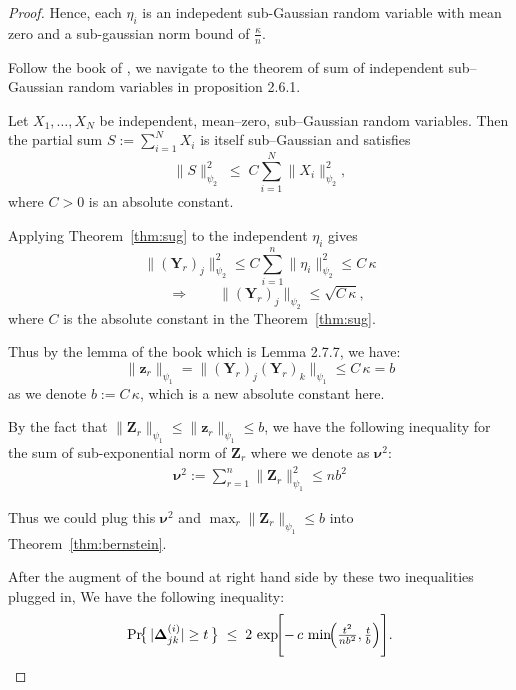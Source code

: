 \documentclass[11pt]{article}
\numberwithin{equation}{section}
\theoremstyle{plain}
\theoremstyle{definition}
\theoremstyle{remark}
\begin{document}
\begin{proof}
Hence, each \(\eta_{i}\) is an indepedent sub-Gaussian random variable with mean zero and a sub-gaussian norm bound of \(\frac{\kappa}{n}\).

Follow the book of \cite{vershynin2018high}, we navigate to the theorem of sum of independent sub–Gaussian random variables in proposition 2.6.1.

\begin{thm}
  \label{thm:sug}

  Let \(X_{1},\dots ,X_{N}\) be independent, mean–zero, sub–Gaussian
  random variables.  Then the partial sum
  \(S:=\sum_{i=1}^{N}X_{i}\) is itself sub–Gaussian and satisfies
  \[
    \bigl\|S\bigr\|_{\psi_{2}}^{2}
       \;\le\;
       C\sum_{i=1}^{N}\bigl\|X_{i}\bigr\|_{\psi_{2}}^{2},
  \]
  where \(C>0\) is an absolute constant.
  \end{thm}


  Applying Theorem~\ref{thm:sug} to the independent \(\eta_{i}\) gives
  \[
    \|(\mathbf{Y}_{r})_{j}\|_{\psi_{2}}^{2}
       \le C \sum_{i=1}^{n}\|\eta_{i}\|_{\psi_{2}}^{2}
       \le C\,\kappa
  \]
  \[
    \quad\Longrightarrow\qquad
    \|(\mathbf{Y}_{r})_{j}\|_{\psi_{2}}\le\sqrt{C\,\kappa},
  \]
  where \(C\) is the absolute constant in the Theorem~\ref{thm:sug}.

Thus by the lemma of the book\cite{vershynin2018high} which is Lemma 2.7.7, we have:
\[
  \|\mathbf{z}_{r}\|_{\psi_{1}} = \|(\mathbf{Y}_{r})_{j}(\mathbf{Y}_{r})_{k}\|_{\psi_{1}} \leq C\,\kappa = b
\]
as we denote \( b := C\,\kappa \), which is a new absolute constant here.

By the fact that $\|\mathbf{Z}_{r}\|_{\psi_{1}} \leq \|\mathbf{z}_{r}\|_{\psi_{1}} \leq b$, we have
the following inequality for the sum of sub-exponential norm of \(\mathbf{Z}_{r}\) where we denote as \(\boldsymbol{\nu}^{2}\):
\begin{align*}
  \boldsymbol{\nu}^{2} := \sum_{r=1}^{n}\|\mathbf{Z}_{r}\|_{\psi_{1}}^{2}
  \leq n b^{2}
\end{align*}

Thus we could plug this $\boldsymbol\nu^{2}$ and $\max_{r}\|\mathbf{Z}_{r}\|_{\psi_{1}} \le b$ into Theorem~\ref{thm:bernstein}.

After the augment of the bound at right hand side by these two inequalities plugged in, We have the following inequality:
  \[
\Pr\!\bigl\{\,|\mathbf{\Delta}_{jk}^{(i)}|\ge t\,\bigr\}
   \;\le\;
   2\,\exp\!\Biggl[
     -\,c\,
     \min\!\Bigl(
       \tfrac{t^{2}}{n b^{2}},
       \tfrac{t}{b}
     \Bigr)
   \Biggr].
\]


\end{proof}
\end{document}
